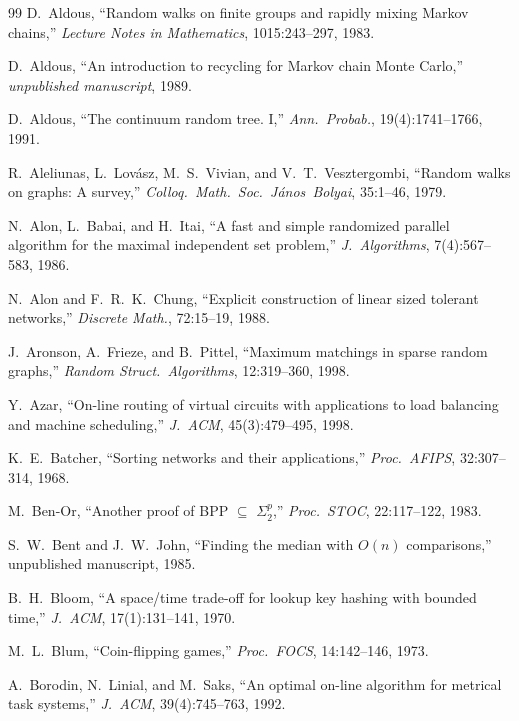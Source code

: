 \documentclass[twoside,12pt]{book}
\theoremstyle{plain}
\theoremstyle{definition}
\theoremstyle{remark}
\begin{document}
\begin{thebibliography}{99}
D.~Aldous,
``Random walks on finite groups and rapidly mixing Markov chains,''
\textit{Lecture Notes in Mathematics}, 1015:243--297, 1983.

D.~Aldous,
``An introduction to recycling for Markov chain Monte Carlo,''
\textit{unpublished manuscript}, 1989.

D.~Aldous,
``The continuum random tree. I,''
\textit{Ann.~Probab.}, 19(4):1741--1766, 1991.

R.~Aleliunas, L.~Lov\'{a}sz, M.~S.~Vivian, and V.~T.~Vesztergombi,
``Random walks on graphs: A survey,''
\textit{Colloq.~Math.~Soc.~J\'{a}nos~Bolyai}, 35:1--46, 1979.

N.~Alon, L.~Babai, and H.~Itai,
``A fast and simple randomized parallel algorithm for the maximal independent set problem,''
\textit{J.~Algorithms}, 7(4):567--583, 1986.

N.~Alon and F.~R.~K.~Chung,
``Explicit construction of linear sized tolerant networks,''
\textit{Discrete Math.}, 72:15--19, 1988.

J.~Aronson, A.~Frieze, and B.~Pittel,
``Maximum matchings in sparse random graphs,''
\textit{Random Struct.~Algorithms}, 12:319--360, 1998.

Y.~Azar,
``On-line routing of virtual circuits with applications to load balancing and machine scheduling,''
\textit{J.~ACM}, 45(3):479--495, 1998.

K.~E.~Batcher,
``Sorting networks and their applications,''
\textit{Proc.~AFIPS}, 32:307--314, 1968.

M.~Ben-Or,
``Another proof of BPP $\subseteq$ $\Sigma_2^p$,''
\textit{Proc.~STOC}, 22:117--122, 1983.

S.~W.~Bent and J.~W.~John,
``Finding the median with $O(n)$ comparisons,''
unpublished manuscript, 1985.

B.~H.~Bloom,
``A space/time trade-off for lookup key hashing with bounded time,''
\textit{J.~ACM}, 17(1):131--141, 1970.

M.~L.~Blum,
``Coin-flipping games,''
\textit{Proc.~FOCS}, 14:142--146, 1973.

A.~Borodin, N.~Linial, and M.~Saks,
``An optimal on-line algorithm for metrical task systems,''
\textit{J.~ACM}, 39(4):745--763, 1992.


\end{thebibliography}
\end{document}
